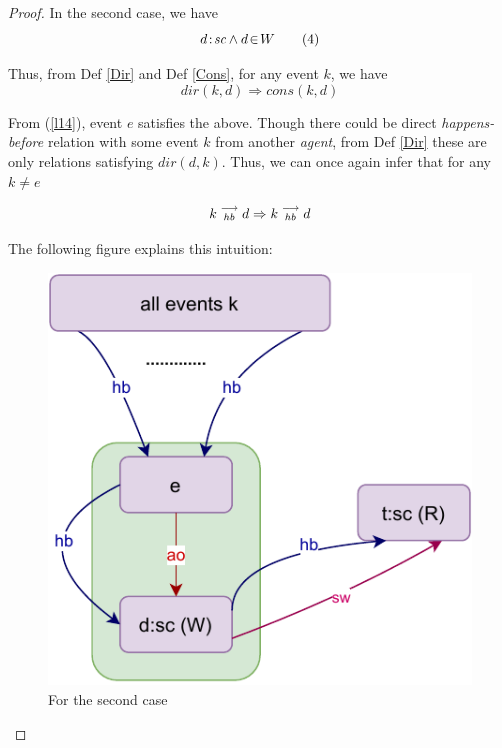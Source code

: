 \begin{proof}
    In the second case, we have 
    \[
        d\!:\!\textit{sc} \wedge d\!\in\!W
        \tag{4}
        \label{l14}
    \]
    
    Thus, from Def \ref{Dir} and Def \ref{Cons}, for any event $k$, we have 
    \[
        dir(k,d) \Rightarrow cons(k,d)
    \]
    
    From (\ref{l14}), event $e$ satisfies the above.
    Though there could be direct \textit{happens-before} relation with some event $k$ from another \textit{agent}, from Def \ref{Dir} these are only relations satisfying $dir(d,k)$. Thus, we can once again infer that for any $k \neq e$ 
    
    \[
        k\stackrel{\longrightarrow}{_{hb}}d \Rightarrow k\stackrel{\longrightarrow}{_{hb}}d
    \]
    
    The following figure explains this intuition: 
    
    \begin{figure}[H]
        \centering
        \includegraphics[scale=0.7]{5.InstructionReordering/3.Lemmas/lemma_proof1_case2.pdf}
        \caption{For the second case}
        \label{fig:my_label}
    \end{figure}
    
\end{proof}


